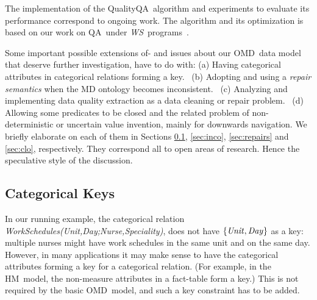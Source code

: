 \documentclass[format=acmsmall, review=false, screen=true]{acmart}
\newcommand{\ignore}[1]{}
\newcommand{\nit}[1]{{\it #1}}
\newcommand{\m}{\;\!\!}
\newcommand{\WS}{{\em W\m{}S}}
\newcommand{\CQQA}{{\sf QualityQA}}
\newcommand{\qa}{QA}
\newcommand{\omd}{OMD}
\newcommand{\hm}{HM}
\newcommand{\red}[1]{{#1}}
\begin{document}
\red{The implementation of the \CQQA \ algorithm and experiments to evaluate its performance correspond to ongoing work. The algorithm and its optimization is based on our work on \qa \ under \WS \ programs~\cite{milani16rr,milani16rr-cali}.}


Some important possible extensions of- and issues about our \omd \ data model that deserve further investigation, have to do with: (a) Having categorical attributes in categorical relations forming a key. \ (b) Adopting and using a {\em repair semantics} when the MD ontology becomes inconsistent. \ (c) Analyzing and implementing data quality extraction as a data cleaning or repair problem. \ (d) Allowing some predicates to be closed and the related problem of non-deterministic or uncertain value invention, mainly for downwards navigation. We briefly elaborate on each of them in Sections
\ref{sec:catKeys}, \ref{sec:inco}, \ref{sec:repairs} and \ref{sec:clo}, respectively. \red{They correspond all to open areas of research. Hence the speculative style of the discussion.}






\subsection{Categorical Keys}\label{sec:catKeys}

In our running example, the categorical relation \nit{WorkSchedules(Unit,Day;Nurse,Speciality)}, does not have $\{\nit{Unit},\nit{Day}\}$ as a key: multiple nurses might have work schedules in the same unit and on the same day.
However, in many applications it may make sense to have the categorical attributes forming a key for a categorical relation. (For example, in the
\hm \ model, the non-measure attributes in a fact-table form a key.) This is not required by the basic \omd \ model, and such a key constraint has to be added.

\ignore{
There are still cases when categorical attributes define key attributes in categorical relations. For example in \nit{InstitutionBoard(Institution;Chair,President,CEO)}, if there is only one board directory (i.e. chair, ceo, and president) for an institution, then attribute \nit{Institution} is a key attribute for the relation.

Here, we discuss the effect of considering {\em categorical keys}, i.e. making categorical attributes form a key for their categorical relations. More precisely, we}
\end{document}
